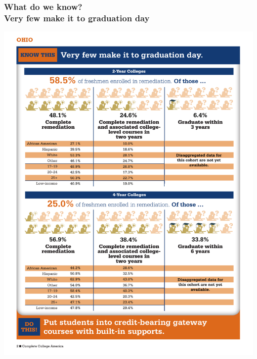 \documentclass[13pt]{beamer}
\newcounter{a}
\newcounter{b}
\begin{document}
\begin{frame}
  \frametitle{What do we know? \\ Very few make it to graduation day}

  \includegraphics[clip,trim=0cm 7.8cm 0cm 13.5cm, width=\textwidth]{very-few-make-it-to-graduation.pdf}
\end{frame}
\end{document}
